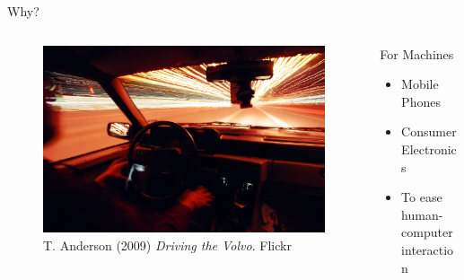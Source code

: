 \begin{frame}{Why?}
\begin{columns}[c]
\begin{column}{0.5\textwidth}
{		}
		\only<2> {
			\begin{figure}
			\centering
			\includegraphics[width=\textwidth,height=0.6\textheight,keepaspectratio]{fig/driving.jpg}
			\caption{T. Anderson (2009) \textit{Driving the Volvo}. Flickr}
			\end{figure}
		}
	\end{column}
	\begin{column}{0.4\textwidth}
		\begin{block}{For Machines}
			\begin{itemize}
				\item<1-> Mobile Phones
				\item<1-> Consumer Electronics
				\item<2-> To ease human-computer interaction
			\end{itemize}
		\end{block}
	\end{column}
	\end{columns}
\end{frame}
